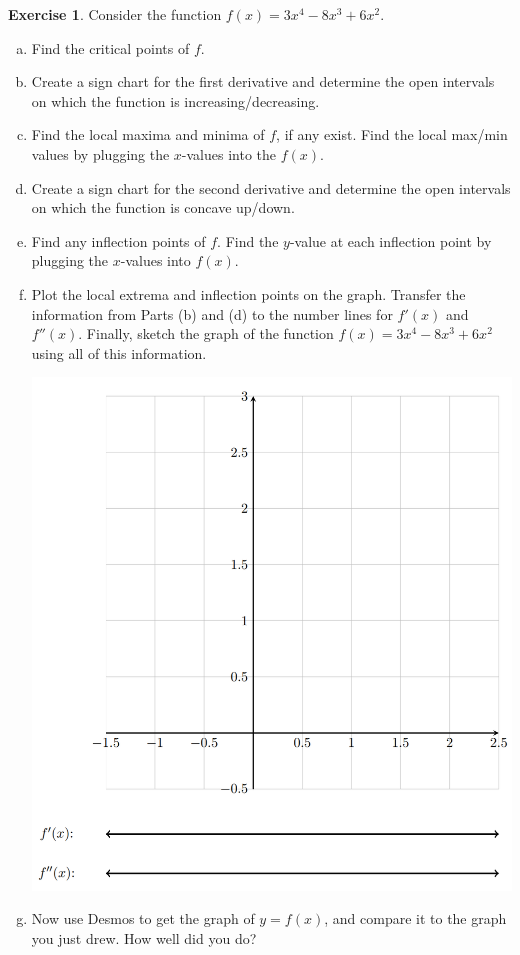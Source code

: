 \documentclass[11pt,reqno,final]{amsart}
\numberwithin{figure}{section}
\theoremstyle{definition} %
\newtheorem{exercise}[question]{Exercise}
\begin{document}
\begin{exercise}
        Consider the function $f(x) = 3x^4-8x^3 + 6x^2$.
        \begin{enumerate}[(a)]
        \item Find the critical points of $f$.
                \vfill
        \item Create a sign chart for the first derivative and determine the open intervals on which the function is increasing/decreasing.
                \vfill
        \item Find the local maxima and minima of $f$, if any exist. Find the local max/min values by plugging the $x$-values into the $f(x)$.
                \vfill
        \item Create a sign chart for the second derivative and determine the open intervals on which the function is concave up/down.
                \vfill
        \item Find any inflection points of $f$. Find the $y$-value at each inflection point by plugging the $x$-values into $f(x)$.
                \vfill
                \newpage
        \item Plot the local extrema and inflection points on the graph.
                Transfer the information from Parts (b) and (d) to the number lines for $f'(x)$ and $f''(x)$.
                Finally, sketch the graph of the function $f(x) = 3x^4-8x^3+6x^2$ using all of this information.
                \begin{center}
                        \includegraphics[width=.9\textwidth]{12-07P2.png} \qquad \qquad\qquad \qquad
                \end{center}
        \item Now use Desmos to get the graph of $y = f(x)$, and compare it to the graph you just drew. How well did you do?
        \end{enumerate}
\end{exercise}
\end{document}
